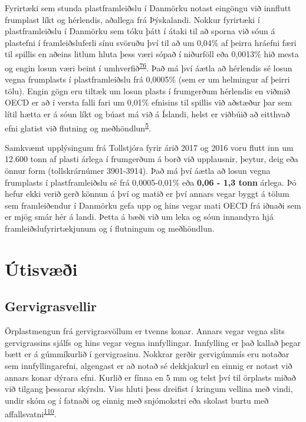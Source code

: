 \documentclass[icelandic,]{book}
\begin{document}
Fyrirtæki sem stunda plastframleiðslu í Danmörku notast eingöngu við innflutt frumplast líkt og hérlendis, aðallega frá Þýskalandi. Nokkur fyrirtæki í plastframleiðslu í Danmörku sem tóku þátt í átaki til að sporna við sóun á plastefni í framleiðsluferli sínu svöruðu því til að um 0,04\% af þeirra hráefni færi til spillis en aðeins litlum hluta þess væri sópað í niðurföll eða 0,0013\% hið mesta og engin losun væri beint í umhverfið\textsuperscript{\protect\hyperlink{ref-lassen2015microplastics}{76}}. Það má því áætla að hérlendis sé losun vegna frumplasts í plastframleiðslu frá 0,0005\% (sem er um helmingur af þeirri tölu). Engin gögn eru tiltæk um losun plasts í frumgerðum hérlendis en viðmið OECD er að í versta falli fari um 0,01\% efnisins til spillis við aðstæður þar sem lítil hætta er á sóun líkt og búast má við á Íslandi, helst er viðbúið að eitthvað efni glatist við flutning og meðhöndlun\textsuperscript{\protect\hyperlink{ref-OECD2009}{5}}.

Samkvæmt upplýsingum frá Tollstjóra fyrir árið 2017 og 2016 voru flutt inn um 12.600 tonn af plasti árlega í frumgerðum á borð við upplausnir, þeytur, deig eða önnur form (tollskrárnúmer 3901-3914). Það má því áætla að losun vegna frumplasts í plastframleiðslu sé frá 0,0005-0,01\% eða \textbf{0,06 - 1,3 tonn} árlega. Þó hefur ekki verið gerð könnun á því og matið er því annars vegar byggt á tölum sem framleiðendur í Danmörku gefa upp og hins vegar mati OECD frá iðnaði sem er mjög smár hér á landi. Þetta á bæði við um leka og sóun innandyra hjá framleiðslufyrirtækjunum og í flutningum og meðhöndlun.

\hypertarget{utisvi}{%
\section*{Útisvæði}\label{utisvi}}

\hypertarget{gervigrasvellir}{%
\subsection*{Gervigrasvellir}\label{gervigrasvellir}}

Örplastmengun frá gervigrasvöllum er tvenns konar. Annars vegar vegna slits gervigrassins sjálfs og hins vegar vegna innfyllingar. Innfylling er það kallað þegar bætt er á gúmmíkurlið í gervigrasinu. Nokkrar gerðir gervigúmmís eru notaðar sem innfyllingarefni, algengast er að notað sé dekkjakurl en einnig er notast við annars konar dýrara efni. Kurlið er fínna en 5 mm og telst því til örplasts miðað við tilgang þessarar skýrslu. Viss hluti þess dreifist í kringum vellina með vindi, undir skóm og í fatnaði og einnig með snjómokstri eða skolast burtu með affallsvatni\textsuperscript{\protect\hyperlink{ref-Wredh2014}{110}}.
\end{document}
